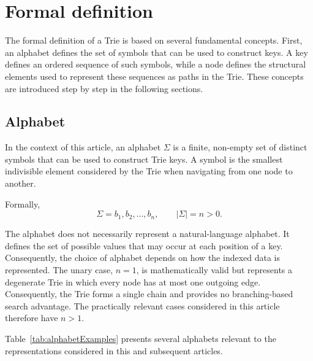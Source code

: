\documentclass[11pt,twoside]{article}
\begin{document}
    \section{Formal definition}\label{formal-definition}

    The formal definition of a Trie is based on several fundamental concepts.
    First, an alphabet defines the set of symbols that can be used to construct keys.
    A key defines an ordered sequence of such symbols, while a node defines the structural elements
    used to represent these sequences as paths in the Trie. These concepts are introduced step by step
    in the following sections.

    \subsection{Alphabet}\label{alphabet}

    In the context of this article, an alphabet \(\Sigma\) is a finite, non-empty set of distinct symbols
    that can be used to construct Trie keys. A symbol is the smallest indivisible element considered by
    the Trie when navigating from one node to another.

    Formally,
    \begin{equation}
        \Sigma = {b_1, b_2, \ldots, b_n}, \qquad |\Sigma| = n > 0.
    \end{equation}

    The alphabet does not necessarily represent a natural-language alphabet. It defines the set of
    possible values that may occur at each position of a key. Consequently, the choice of alphabet depends
    on how the indexed data is represented.
    The unary case, \(n=1\), is mathematically valid but represents a degenerate Trie in which every node
    has at most one outgoing edge. Consequently, the Trie forms a single chain and provides no branching-based
    search advantage. The practically relevant cases considered in this article therefore have \(n > 1\).

    Table~\ref{tab:alphabetExamples} presents several alphabets relevant to the representations considered in this
    and subsequent articles.
\end{document}
